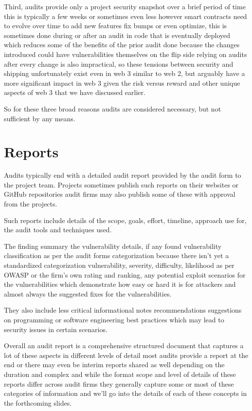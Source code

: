 Third, audits provide only a project security snapshot over a brief period of time this is typically a few weeks or sometimes even less however smart contracts need to evolve over time to add new features fix bumps or even optimize, this is sometimes done during or after an audit in code that is eventually deployed which reduces some of the benefits of the prior audit done because the changes introduced could have vulnerabilities themselves on the flip side relying on audits after every change is also impractical, so these tensions between security and shipping unfortunately exist even in web 3 similar to web 2, but arguably have a more significant impact in web 3 given the risk versus reward and other unique aspects of web 3 that we have discussed earlier.

So for these three broad reasons audits are considered necessary, but not sufficient by any means.

\section{Reports}

Audits typically end with a detailed audit report provided by the audit form to the project team. Projects sometimes publish such reports on their websites or GitHub repositories audit firms may also publish some of these with approval from the projects. 

Such reports include details of the scope, goals, effort, timeline, approach use for, the audit tools and techniques used. 

The finding summary the vulnerability details, if any found vulnerability classification as per the audit forms categorization because there isn't yet a standardized categorization vulnerability, severity, difficulty, likelihood as per OWASP or the firm's own rating and ranking, any potential exploit scenarios for the vulnerabilities which demonstrate how easy or hard it is for attackers and almost always the suggested fixes for the vulnerabilities.

They also include less critical informational notes recommendations suggestions on programming or software engineering best practices which may lead to security issues in certain scenarios.

Overall an audit report is a comprehensive structured document that captures a lot of these aspects in different levels of detail most audits provide a report at the end or there may even be interim reports shared as well depending on the duration and complex and while the format scope and level of details of these reports differ across audit firms they generally capture some or most of these categories of information and we'll go into the details of each of these concepts in the forthcoming slides.

